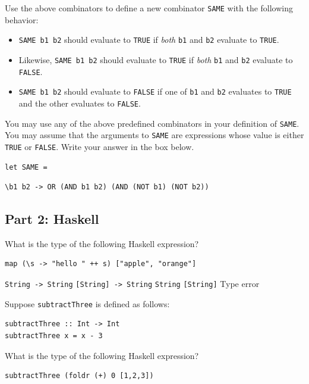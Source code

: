 \documentclass[addpoints]{exam}
\begin{document}
\begin{questions}
Use the above combinators to define a new combinator \texttt{SAME} with the following behavior:
\begin{itemize}
\item \texttt{SAME b1 b2} should evaluate to \texttt{TRUE} if \emph{both} \texttt{b1} and \texttt{b2} evaluate to \texttt{TRUE}.
\item Likewise, \texttt{SAME b1 b2} should evaluate to \texttt{TRUE} if \emph{both} \texttt{b1} and \texttt{b2} evaluate to \texttt{FALSE}.
\item \texttt{SAME b1 b2} should evaluate to \texttt{FALSE} if one of \texttt{b1} and \texttt{b2} evaluates to \texttt{TRUE} and the other evaluates to \texttt{FALSE}.
\end{itemize}

You may use any of the above predefined combinators in your definition of \texttt{SAME}.  You may assume that the arguments to \texttt{SAME} are expressions whose value is either \texttt{TRUE} or \texttt{FALSE}.  Write your answer in the box below.

\begin{verbatim}let SAME =\end{verbatim}
  \begin{solutionorbox}[1.5in]
  \begin{verbatim}\b1 b2 -> OR (AND b1 b2) (AND (NOT b1) (NOT b2))  
  \end{verbatim}
  \end{solutionorbox}

\newpage

\subsection*{\textbf{Part 2: Haskell}}

\question[5] What is the type of the following Haskell expression?
\begin{verbatim}map (\s -> "hello " ++ s) ["apple", "orange"]
\end{verbatim}

\begin{choices}
  \choice \texttt{String -> String}
  \choice \texttt{[String] -> String}
  \choice \texttt{String}
  \CorrectChoice \texttt{[String]}
  \choice Type error
\end{choices}

\question[5] Suppose \texttt{subtractThree} is defined as follows:
\begin{verbatim}
subtractThree :: Int -> Int
subtractThree x = x - 3
\end{verbatim}
What is the type of the following Haskell expression?
\begin{verbatim}subtractThree (foldr (+) 0 [1,2,3])
\end{verbatim}


\end{questions}
\end{document}
